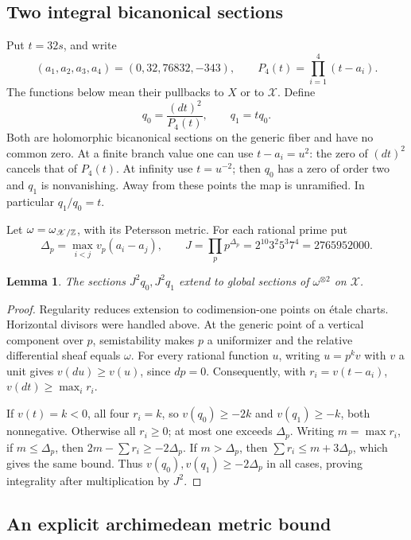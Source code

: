\documentclass[11pt]{article}
\newtheorem{lemma}[theorem]{Lemma}
\theoremstyle{definition}
\begin{document}
\subsection{Two integral bicanonical sections}
\label{sec:bicanonical}

Put \(t=32s\), and write
\[
 (a_1,a_2,a_3,a_4)=(0,32,76832,-343),\qquad
 P_4(t)=\prod_{i=1}^4(t-a_i).
\]
The functions below mean their pullbacks to \(X\) or to
\(\mathscr X\). Define
\[
             q_0=\frac{(dt)^2}{P_4(t)},\qquad q_1=tq_0.
\]
Both are holomorphic bicanonical sections on the generic fiber
and have no common zero. At a finite branch value one can use
\(t-a_i=u^2\): the zero of \((dt)^2\) cancels that of
\(P_4(t)\). At infinity use \(t=u^{-2}\); then \(q_0\)
has a zero of order two and \(q_1\) is nonvanishing. Away from
these points the map is unramified. In particular \(q_1/q_0=t\).

Let \(\omega=\omega_{\mathscr X/\mathbb Z}\), with its Petersson metric.
For each rational prime put
\[
 \Delta_p=\max_{i<j}v_p(a_i-a_j),\qquad
 J=\prod_p p^{\Delta_p}=2^{10}3^2 5^3 7^4=2765952000.
\]

\begin{lemma}\label{lem:integral-bicanonical}
The sections \(J^2q_0,J^2q_1\) extend to global sections of
\(\omega^{\otimes2}\) on \(\mathscr X\).
\end{lemma}
\begin{proof}
Regularity reduces extension to codimension-one points on \'etale
charts. Horizontal divisors were handled above. At the generic
point of a vertical component over \(p\), semistability makes
\(p\) a uniformizer and the relative differential sheaf equals
\(\omega\). For every rational function \(u\), writing
\(u=p^kv\) with \(v\) a unit gives \(v(du)\ge v(u)\),
since \(dp=0\). Consequently, with \(r_i=v(t-a_i)\),
\(v(dt)\ge\max_i r_i\).

If \(v(t)=k<0\), all four \(r_i=k\), so
\(v(q_0)\ge-2k\) and \(v(q_1)\ge-k\), both nonnegative.
Otherwise all \(r_i\ge0\); at most one exceeds \(\Delta_p\).
Writing \(m=\max r_i\), if \(m\le\Delta_p\), then
\(2m-\sum r_i\ge-2\Delta_p\). If \(m>\Delta_p\), then
\(\sum r_i\le m+3\Delta_p\), which gives the same bound.
Thus \(v(q_0),v(q_1)\ge-2\Delta_p\) in all cases, proving
integrality after multiplication by \(J^2\).
\end{proof}

\subsection{An explicit archimedean metric bound}
\label{sec:metric-bound}
\end{document}
